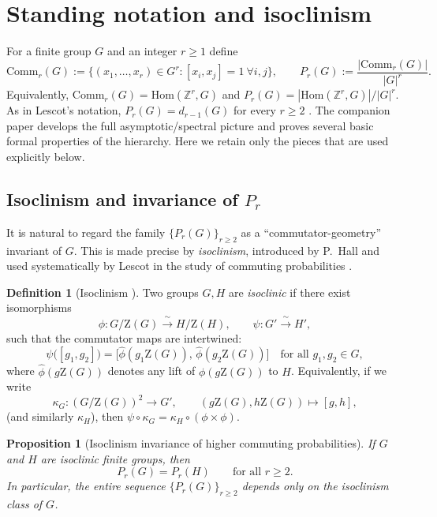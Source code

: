 \documentclass[11pt]{article}
\newtheorem{proposition}[theorem]{Proposition}
\theoremstyle{definition}
\newtheorem{definition}[theorem]{Definition}
\theoremstyle{remark}
\theoremstyle{definition}
\theoremstyle{plain}
\newcommand{\Hom}{\mathrm{Hom}}
\newcommand{\Z}{\mathrm{Z}}
\newcommand{\Comm}{\mathrm{Comm}}
\begin{document}
\section{Standing notation and isoclinism}

For a finite group $G$ and an integer $r\ge 1$ define
\[
\Comm_r(G):=\{(x_1,\dots,x_r)\in G^r : [x_i,x_j]=1\ \forall i,j\},
\qquad
P_r(G):=\frac{|\Comm_r(G)|}{|G|^r}.
\]
Equivalently, $\Comm_r(G)=\Hom(\mathbb Z^r,G)$ and $P_r(G)=|\Hom(\mathbb Z^r,G)|/|G|^r$.
As in Lescot's notation, $P_r(G)=d_{r-1}(G)$ for every $r\ge 2$ \cite{Lescot1995,RezaeiNiroomandErfanian2014}.
The companion paper \cite{LevitShwartzPartI} develops the full asymptotic/spectral picture and proves several basic formal properties of the hierarchy.  Here we retain only the pieces that are used explicitly below.

\subsection{Isoclinism and invariance of \texorpdfstring{$P_r$}{Pr}}\label{subsec:isoclinism}

It is natural to regard the family $\{P_r(G)\}_{r\ge 2}$ as a ``commutator-geometry'' invariant of $G$.
This is made precise by \emph{isoclinism}, introduced by P.~Hall \cite{Hall1940} and used systematically by
Lescot in the study of commuting probabilities \cite{Lescot1995}.

\begin{definition}[Isoclinism \cite{Hall1940}]\label{def:isoclinism}
Two groups $G,H$ are \emph{isoclinic} if there exist isomorphisms
\[
\phi:G/\Z(G)\xrightarrow{\ \sim\ } H/\Z(H),
\qquad
\psi:G'\xrightarrow{\ \sim\ } H',
\]
such that the commutator maps are intertwined:
\[
\psi\big([g_1,g_2]\big)=\big[\widehat{\phi}(g_1\Z(G)),\,\widehat{\phi}(g_2\Z(G))\big]
\quad\text{for all }g_1,g_2\in G,
\]
where $\widehat{\phi}(g\Z(G))$ denotes any lift of $\phi(g\Z(G))$ to $H$.
Equivalently, if we write
\[
\kappa_G:(G/\Z(G))^2\to G',\qquad (g\Z(G),h\Z(G))\mapsto [g,h],
\]
(and similarly $\kappa_H$), then $\psi\circ \kappa_G=\kappa_H\circ(\phi\times\phi)$.
\end{definition}

\begin{proposition}[Isoclinism invariance of higher commuting probabilities]\label{prop:isoclinism-invariant}
If $G$ and $H$ are isoclinic finite groups, then
\[
P_r(G)=P_r(H)\qquad\text{for all }r\ge 2.
\]
In particular, the entire sequence $\{P_r(G)\}_{r\ge 2}$ depends only on the isoclinism class of $G$.
\end{proposition}
\end{document}
